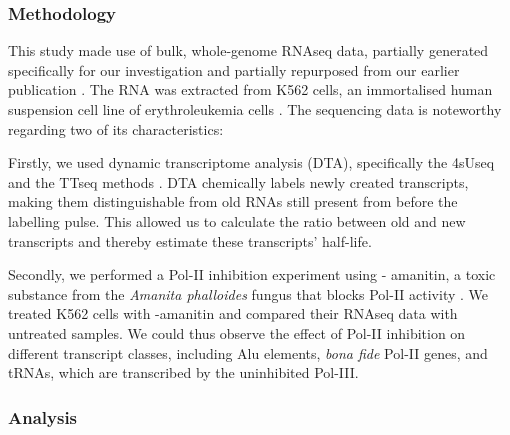 \subsubsection{Methodology}\label{subsubsec:alumethod}
This study made use of bulk, whole-genome RNAseq data, partially generated
specifically for our investigation and partially repurposed from our earlier
publication \citet{Schwalb2016a}. The RNA was extracted from K562 cells, an
immortalised human suspension cell line of erythroleukemia cells
\citep{Andersson1979}. The sequencing data is noteworthy regarding two of its
characteristics:

Firstly, we used dynamic transcriptome analysis (DTA), specifically the 4sUseq
and the TTseq methods \citep{Schwalb2012,Gressel2019}. DTA chemically labels
newly created transcripts, making them distinguishable from old RNAs still
present from before the labelling pulse. This allowed us to calculate the
ratio between old and new transcripts and thereby estimate these transcripts'
half-life.

Secondly, we performed a Pol-II inhibition experiment using \textalpha-%
amanitin, a toxic substance from the \textit{Amanita phalloides} fungus that
blocks Pol-II activity \citep{Lindell1970,Kedinger1970,Stirpe1967,Jacob1970}.
We treated K562 cells with \textalpha-amanitin and compared their RNAseq data
with untreated samples. We could thus observe the effect of Pol-II inhibition
on different transcript classes, including Alu elements, \textit{bona fide}
Pol-II genes, and tRNAs, which are transcribed by the uninhibited Pol-III.

\subsubsection{Analysis}\label{subsubsec:aluanalysis}


